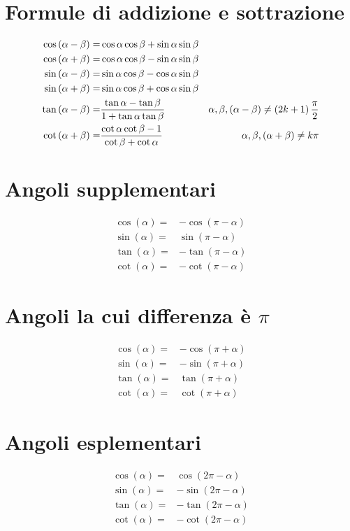 \section{Formule di addizione e sottrazione}
\begin{align}
\cos\left(\alpha-\beta\right)=&{}\cos\alpha\cos\beta+\sin\alpha\sin\beta\\\index{Coseno!differenza angoli}
\cos\left(\alpha+\beta\right)=&{}\cos\alpha\cos\beta-\sin\alpha\sin\beta\\\index{Coseno!somma angoli}
\sin\left(\alpha-\beta\right)=&{}\sin\alpha\cos\beta-\cos\alpha\sin\beta\\\index{Seno!differenza angoli}
\sin\left(\alpha+\beta\right)=&{}\sin\alpha\cos\beta+\cos\alpha\sin\beta\\\index{Seno!somma angoli}
\tan\left(\alpha-\beta\right)=&{}\dfrac{\tan\alpha-\tan\beta}{1+\tan\alpha\tan\beta} &\alpha,\beta,\left(\alpha-\beta\right)\neq\left(2k+1\right)\dfrac{\pi}{2}\\\index{Tangente!differenza angoli}
\cot\left(\alpha+\beta\right)=&{}\dfrac{\cot\alpha\cot\beta-1}{\cot\beta+\cot\alpha}
&\alpha,\beta,\left(\alpha+\beta\right)\neq k\pi\index{Cotangente!somma angoli}
\end{align}
\section{Angoli supplementari}
\begin{align}
\cos(\alpha)=&-\cos(\pi-\alpha)\\
\sin(\alpha)=&\sin(\pi-\alpha)\\
\tan(\alpha)=&-\tan(\pi-\alpha)\\
\cot(\alpha)=&-\cot(\pi-\alpha)
\end{align}
\section{Angoli la cui differenza è \texorpdfstring{$\pi$}{\textpi}}
\begin{align}
\cos(\alpha)=&-\cos(\pi+\alpha)\\
\sin(\alpha)=&-\sin(\pi+\alpha)\\
\tan(\alpha)=&\tan(\pi+\alpha)\\
\cot(\alpha)=&\cot(\pi+\alpha)
\end{align}
\section{Angoli esplementari}
\begin{align}
\cos(\alpha)=&\cos(2\pi-\alpha)\\
\sin(\alpha)=&-\sin(2\pi-\alpha)\\
\tan(\alpha)=&-\tan(2\pi-\alpha)\\
\cot(\alpha)=&-\cot(2\pi-\alpha)
\end{align}
